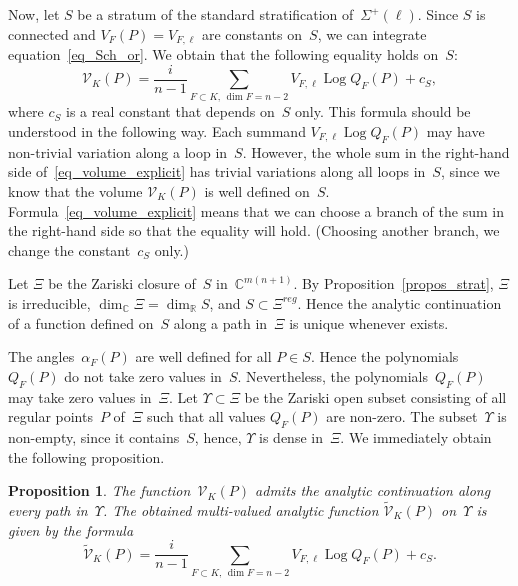 \documentclass[reqno,tbtags,12pt]{amsart}
\numberwithin{equation}{section}
\newcommand{\R}{\mathbb{R}}
\newcommand{\C}{\mathbb{C}}
\newcommand{\CV}{\mathcal{V}}
\newcommand{\tCV}{\widetilde{\mathcal{V}}}
\newcommand{\bell}{\boldsymbol{\ell}}
\newcommand{\Log}{\mathop{\mathrm{Log}}\nolimits}
\newtheorem{propos}[theorem]{Proposition}
\theoremstyle{definition}
\begin{document}
Now, let $S$ be a stratum of the standard stratification of~$\Sigma^+(\bell)$.
Since $S$ is connected and $V_F( P)=V_{F,\bell}$ are constants on~$S$, we can integrate equation~\eqref{eq_Sch_or}. We obtain that the following equality holds on~$S$:
\begin{equation}\label{eq_volume_explicit}
\CV_K( P)=\frac{i}{n-1}\sum_{F\subset K,\,\dim F=n-2}V_{F,\bell}\Log Q_F( P)+c_S,
\end{equation}
where $c_S$ is a real constant that depends on~$S$ only. This formula should be understood in the following way. Each summand $V_{F,\bell}\Log Q_F( P)$ may have non-trivial variation along a loop in~$S$. However, the whole sum in the right-hand side of~\eqref{eq_volume_explicit} has trivial variations along all loops in~$S$, since we know that the volume $\CV_K( P)$ is well defined on~$S$. Formula~\eqref{eq_volume_explicit} means that we can choose a branch of the sum in the right-hand side so that the equality will hold. (Choosing another branch, we change the constant~$c_S$ only.)


Let $\Xi$ be the Zariski closure of~$S$ in~$\C^{m(n+1)}$. By Proposition~\ref{propos_strat}, $\Xi$ is irreducible, $\dim_{\C}\Xi=\dim_{\R}S$, and $S\subset\Xi^{reg}$. Hence the analytic continuation of a function defined on~$S$ along a path in~$\Xi$ is unique whenever exists.


The angles~$\alpha_F( P)$ are well defined for all $ P\in S$. Hence the polynomials~$Q_F( P)$ do not take zero values in~$S$.  Nevertheless, the polynomials~$Q_F( P)$ may take zero values in~$\Xi$. Let $\Upsilon\subset \Xi$ be the Zariski open subset consisting of all regular points~$ P$ of~$\Xi$ such that all values $Q_F( P)$ are non-zero. The subset~$\Upsilon$ is non-empty, since it contains~$S$, hence, $\Upsilon$ is dense in~$\Xi$. We immediately obtain the following proposition.

\begin{propos}\label{propos_contin}
The function~$\CV_K( P)$ admits the analytic continuation along every path in~$\Upsilon$. The obtained multi-valued analytic function $\tCV_K( P)$ on~$\Upsilon$ is given by the formula
\begin{equation}\label{eq_volume_explicit2}
\tCV_K( P)=\frac{i}{n-1}\sum_{F\subset K,\,\dim F=n-2}V_{F,\bell}\Log Q_F( P)+c_S.
\end{equation}
\end{propos}
\end{document}
